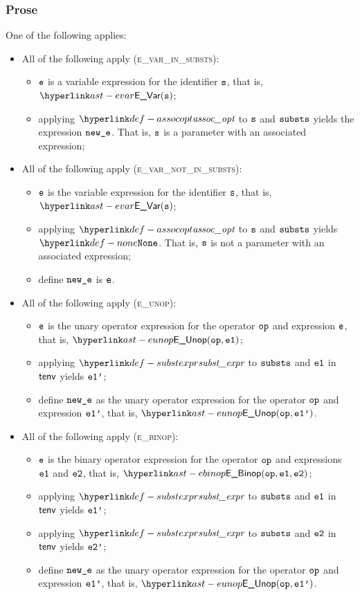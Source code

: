 \subsubsection{Prose}
One of the following applies:
\begin{itemize}
  \item All of the following apply (\textsc{e\_var\_in\_substs}):
  \begin{itemize}
    \item $\texttt{e}$ is a variable expression for the identifier $\texttt{s}$, that is, $\EVar(\vs)$;
    \item applying $\assocopt$ to $\texttt{s}$ and $\texttt{substs}$ yields the expression $\texttt{new\_e}$.
          That is, $\texttt{s}$ is a parameter with an associated expression;
  \end{itemize}

  \item All of the following apply (\textsc{e\_var\_not\_in\_substs}):
  \begin{itemize}
    \item $\texttt{e}$ is the variable expression for the identifier $\texttt{s}$, that is, $\EVar(\vs)$;
    \item applying $\assocopt$ to $\texttt{s}$ and $\texttt{substs}$ yields $\None$.
          That is, $\texttt{s}$ is not a parameter with an associated expression;
    \item define $\texttt{new\_e}$ is $\texttt{e}$.
  \end{itemize}

  \item All of the following apply (\textsc{e\_unop}):
  \begin{itemize}
    \item $\texttt{e}$ is the unary operator expression for the operator $\texttt{op}$ and expression $\texttt{e}$, that is, $\EUnop(\op, \veone)$;
    \item applying $\substexpr$ to $\texttt{substs}$ and $\texttt{e1}$ in $\textsf{tenv}$ yields $\texttt{e1'}$;
    \item define $\texttt{new\_e}$ as the unary operator expression for the operator $\texttt{op}$ and expression $\texttt{e1'}$, that is, $\EUnop(\op, \veonep)$.
  \end{itemize}

  \item All of the following apply (\textsc{e\_binop}):
  \begin{itemize}
    \item $\texttt{e}$ is the binary operator expression for the operator $\texttt{op}$ and expressions $\texttt{e1}$ and $\texttt{e2}$, that is, $\EBinop(\op, \veone, \vetwo)$;
    \item applying $\substexpr$ to $\texttt{substs}$ and $\texttt{e1}$ in $\textsf{tenv}$ yields $\texttt{e1'}$;
    \item applying $\substexpr$ to $\texttt{substs}$ and $\texttt{e2}$ in $\textsf{tenv}$ yields $\texttt{e2'}$;
    \item define $\texttt{new\_e}$ as the unary operator expression for the operator $\texttt{op}$ and expression $\texttt{e1'}$, that is, $\EUnop(\op, \veonep)$.
  \end{itemize}


\end{itemize}
